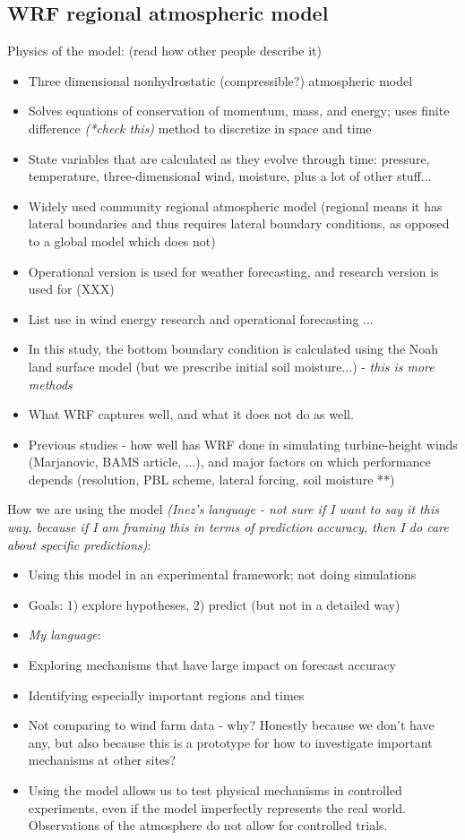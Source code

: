 \documentclass[12pt]{amsart}
\begin{document}
\subsection{WRF regional atmospheric model}

Physics of the model: (read how other people describe it)
\begin{itemize}
\item Three dimensional nonhydrostatic (compressible?) atmospheric model
\item Solves equations of conservation of momentum, mass, and energy; uses finite difference \textit{(*check this)} method to discretize in space and time
\item State variables that are calculated as they evolve through time: pressure, temperature, three-dimensional wind, moisture, plus a lot of other stuff...
\item Widely used community regional atmospheric model (regional means it has lateral boundaries and thus requires lateral boundary conditions, as opposed to a global model which does not)
\item Operational version is used for weather forecasting, and research version is used for (XXX)
\item List use in wind energy research and operational forecasting ...
\item In this study, the bottom boundary condition is calculated using the Noah land surface model (but we prescribe initial soil moisture...) - \textit{this is more methods}
\item What WRF captures well, and what it does not do as well.
\item Previous studies - how well has WRF done in simulating turbine-height winds (Marjanovic, BAMS article, ...), and major factors on which performance depends (resolution, PBL scheme, lateral forcing, soil moisture **)
\end{itemize}

How we are using the model \textit{(Inez's language - not sure if I want to say it this way, because if I am framing this in terms of prediction accuracy, then I do care about specific predictions)}:
\begin{itemize}
\item Using this model in an experimental framework; not doing simulations
\item Goals: 1) explore hypotheses, 2) predict (but not in a detailed way)
\item \textit{My language}:
\item Exploring mechanisms that have large impact on forecast accuracy
\item Identifying especially important regions and times
\item Not comparing to wind farm data - why? Honestly because we don't have any, but also because this is a prototype for how to investigate important mechanisms at other sites?
\item Using the model allows us to test physical mechanisms in controlled experiments, even if the model imperfectly represents the real world.  Observations of the atmosphere do not allow for controlled trials.
\end{itemize}
\end{document}
